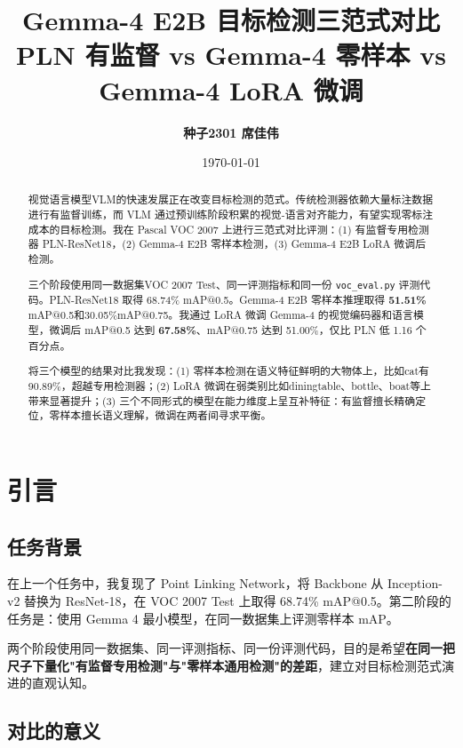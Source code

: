\documentclass[12pt, a4paper]{article}
\title{%
  \vspace{-1.5cm}
  \textbf{Gemma-4 E2B 目标检测三范式对比} \\[6pt]
  \large PLN 有监督 vs Gemma-4 零样本 vs Gemma-4 LoRA 微调
}
\author{\textbf{种子2301 席佳伟}}
\date{\today}
\begin{document}
\maketitle
\thispagestyle{fancy}

\begin{abstract}
视觉语言模型VLM的快速发展正在改变目标检测的范式。传统检测器依赖大量标注数据进行有监督训练，而 VLM 通过预训练阶段积累的视觉-语言对齐能力，有望实现零标注成本的目标检测。我在 Pascal VOC 2007 上进行三范式对比评测：(1) 有监督专用检测器 PLN-ResNet18，(2) Gemma-4 E2B 零样本检测，(3) Gemma-4 E2B LoRA 微调后检测。

三个阶段使用同一数据集VOC 2007 Test、同一评测指标和同一份 \texttt{voc\_eval.py} 评测代码。PLN-ResNet18 取得 68.74\% mAP@0.5。Gemma-4 E2B 零样本推理取得 \textbf{51.51\%} mAP@0.5和30.05\%mAP@0.75。我通过 LoRA 微调 Gemma-4 的视觉编码器和语言模型，微调后 mAP@0.5 达到 \textbf{67.58\%}、mAP@0.75 达到 51.00\%，仅比 PLN 低 1.16 个百分点。

将三个模型的结果对比我发现：(1) 零样本检测在语义特征鲜明的大物体上，比如cat有90.89\%，超越专用检测器；(2) LoRA 微调在弱类别比如diningtable、bottle、boat等上带来显著提升；(3) 三个不同形式的模型在能力维度上呈互补特征：有监督擅长精确定位，零样本擅长语义理解，微调在两者间寻求平衡。
\end{abstract}

\tableofcontents
\newpage

\section{引言}

\subsection{任务背景}

在上一个任务中，我复现了 Point Linking Network，将 Backbone 从 Inception-v2 替换为 ResNet-18，在 VOC 2007 Test 上取得 68.74\% mAP@0.5。第二阶段的任务是：使用 Gemma 4 最小模型，在同一数据集上评测零样本 mAP。

两个阶段使用同一数据集、同一评测指标、同一份评测代码，目的是希望\textbf{在同一把尺子下量化"有监督专用检测"与"零样本通用检测"的差距}，建立对目标检测范式演进的直观认知。

\subsection{对比的意义}
\end{document}
